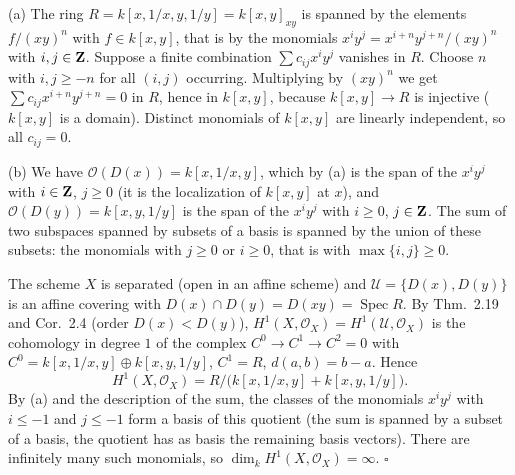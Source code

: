 \documentclass[11pt]{article}
\begin{document}
\pf
(a) The ring $R=k[x,1/x,y,1/y]=k[x,y]_{xy}$ is spanned by the elements $f/(xy)^n$ with $f\in k[x,y]$, that is by the monomials $x^{i}y^{j}=x^{i+n}y^{j+n}/(xy)^n$ with $i,j\in\mathbf Z$. Suppose a finite combination $\sum c_{ij}x^iy^j$ vanishes in $R$. Choose $n$ with $i,j\ge-n$ for all $(i,j)$ occurring. Multiplying by $(xy)^n$ we get $\sum c_{ij}x^{i+n}y^{j+n}=0$ in $R$, hence in $k[x,y]$, because $k[x,y]\to R$ is injective ($k[x,y]$ is a domain). Distinct monomials of $k[x,y]$ are linearly independent, so all $c_{ij}=0$.

(b) We have $\mathcal O(D(x))=k[x,1/x,y]$, which by (a) is the span of the $x^iy^j$ with $i\in\mathbf Z$, $j\ge0$ (it is the localization of $k[x,y]$ at $x$), and $\mathcal O(D(y))=k[x,y,1/y]$ is the span of the $x^iy^j$ with $i\ge0$, $j\in\mathbf Z$. The sum of two subspaces spanned by subsets of a basis is spanned by the union of these subsets: the monomials with $j\ge0$ or $i\ge0$, that is with $\max\{i,j\}\ge0$.

The scheme $X$ is separated (open in an affine scheme) and $\mathcal U=\{D(x),D(y)\}$ is an affine covering with $D(x)\cap D(y)=D(xy)=\operatorname{Spec}R$. By Thm.~2.19 and Cor.~2.4 (order $D(x)<D(y)$), $H^1(X,\mathcal O_X)=H^1(\mathcal U,\mathcal O_X)$ is the cohomology in degree $1$ of the complex $C^0\to C^1\to C^2=0$ with $C^0=k[x,1/x,y]\oplus k[x,y,1/y]$, $C^1=R$, $d(a,b)=b-a$. Hence
\[ H^1(X,\mathcal O_X)=R/\bigl(k[x,1/x,y]+k[x,y,1/y]\bigr). \]
By (a) and the description of the sum, the classes of the monomials $x^iy^j$ with $i\le-1$ and $j\le-1$ form a basis of this quotient (the sum is spanned by a subset of a basis, the quotient has as basis the remaining basis vectors). There are infinitely many such monomials, so $\dim_kH^1(X,\mathcal O_X)=\infty$. \hfill$\square$
\end{document}
